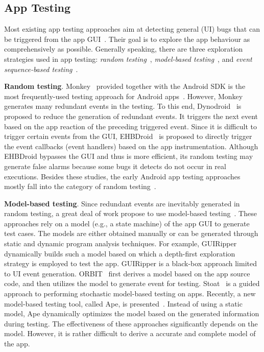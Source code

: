 \documentclass[sigconf,review, anonymous]{acmart}
\begin{document}
\subsection{App Testing}

Most existing app testing approaches aim at  
detecting general (UI) bugs that can be triggered from the app GUI~\cite{ChoudharyGO15,WangLYCZDX18}. Their goal is to explore the app behaviour as comprehensively as possible. Generally speaking, there are three exploration strategies used in app testing\cite{ChoudharyGO15}: \textit{random testing}~\cite{monkey,MachiryTN13,SongQH17}, \textit{model-based testing}~\cite{GUIRipping,grey-box,SuMCWYYPLS17,GuSMC0YZLS19}, and \textit{event sequence-based testing}~\cite{AnandNHY12,EvoDroid,MaoHJ16}. 

\textbf{Random testing}. \textsf{Monkey}~\cite{monkey} provided together with the Android SDK is the most frequently-used testing approach for Android apps~\cite{ChoudharyGO15}. However, \textsf{Monkey} generates many redundant events in the testing. To this end, \textsf{Dynodroid}~\cite{MachiryTN13} is proposed to reduce the generation of redundant events. It triggers the next event based on the app reaction of the preceding triggered event. Since it is difficult to trigger certain events from the GUI, \textsf{EHBDroid}~\cite{SongQH17} is proposed to directly trigger the event callbacks (event handlers) based on the app instrumentation. Although \textsf{EHBDroid} bypasses the GUI and thus is more efficient, its random testing may generate false alarms because some bugs it detects do not occur in real executions. Besides these studies, the early Android app testing approaches mostly fall into the category of random testing~\cite{HuN11,AmalfitanoFT11,GUIRipping,flowdroid}. 

\textbf{Model-based testing}. Since redundant events are inevitably generated in random testing, a great deal of work propose to use model-based testing~\cite{GUIRipping,grey-box,ChoiNS13,a3e,Guided,BaekB16,SuMCWYYPLS17,GuSMC0YZLS19}. These approaches rely on a model (e.g., a state machine) of the app GUI to generate test cases. The models are either obtained manually or can be generated through static and dynamic program analysis techniques. For example, \textsf{GUIRipper}~\cite{GUIRipping} dynamically builds such a model based on which a depth-first exploration strategy is employed to test the app. \textsf{GUIRipper} is a black-box approach limited to UI event generation. \textsf{ORBIT}~\cite{grey-box} first derives a model based on the app source code, and then utilizes the model to generate event for testing. \textsf{Stoat}~\cite{SuMCWYYPLS17} is a guided approach to performing stochastic model-based testing on apps. Recently, a new model-based testing tool, called \textsf{Ape}, is presented~\cite{GuSMC0YZLS19}. Instead of using a static model, \textsf{Ape} dynamically optimizes the model based on the generated information during testing.  
The effectiveness of these approaches significantly depends on the model. However, it is rather difficult to derive a accurate and complete model of the app. 
\end{document}
